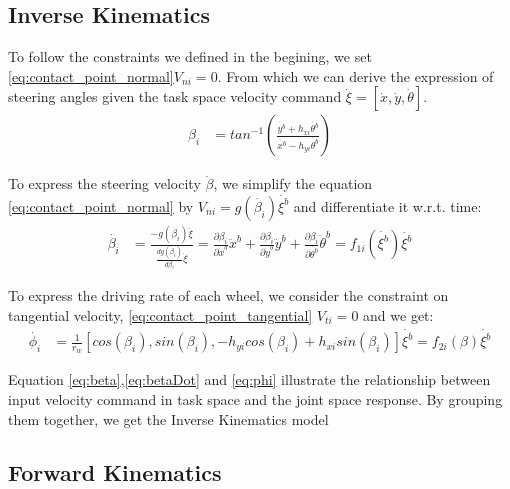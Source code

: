 \subsection{Inverse Kinematics}
\label{sec:inverseKinematics}

To follow the constraints we defined in the begining, we set \cref{eq:contact_point_normal}$V_{ni}=0$. From which we can derive the expression of steering angles given the task space velocity command 
$\dot{\xi}=[\dot{x},\dot{y},\dot{\theta}]$.
\begin{equation}\label{eq:beta}
	\begin{split}
	\beta_i &= tan^{-1}(\frac{\dot{y^b}+h_{xi}\dot{\theta^b}}{\dot{x^b}-h_{yi}\dot{\theta^b}})
	\end{split}
\end{equation}

To express the steering velocity $\dot{\beta}$, we simplify the equation \cref{eq:contact_point_normal} by $V_{ni}=g(\dot{\beta_i})\dot{\xi^b}$ and differentiate it w.r.t. time:
\begin{equation}\label{eq:betaDot}
	\begin{split}
	\dot{\beta_i} &= \frac{-g(\dot{\beta_i})\ddot{\xi}}{\frac{dg(\dot{\beta_i})}{d\beta_i}\dot{\xi}}=\frac{\partial\beta_i}{\partial\dot{x}^b}\ddot{x}^b+\frac{\partial\beta_i}{\partial\dot{y}^b}\ddot{y}^b +\frac{\partial\beta_i}{\partial\dot{\theta^b}}\ddot{\theta}^b
	=f_{1i}(\dot{\xi^b})\ddot{\xi^b}
	\end{split}
\end{equation}

To express the driving rate of each wheel, we consider the constraint on tangential velocity, \cref{eq:contact_point_tangential} $V_{ti}=0 $ and we get:
\begin{equation}\label{eq:phi}
	\begin{split}
	\dot{\phi_i} &= \frac{1}{r_w}[cos(\beta_i), sin(\beta_i), -h_{yi}cos(\beta_i)+h_{xi}sin(\beta_i)]\dot{\xi^b}=f_{2i}(\beta)\dot{\xi^b}
	\end{split}
\end{equation}

Equation \cref{eq:beta},\cref{eq:betaDot} and \cref{eq:phi} illustrate the relationship between input velocity command in task space and the joint space response. By grouping them together, we get the Inverse Kinematics model


\subsection{Forward Kinematics}
\label{sec:forwardKinematics}

